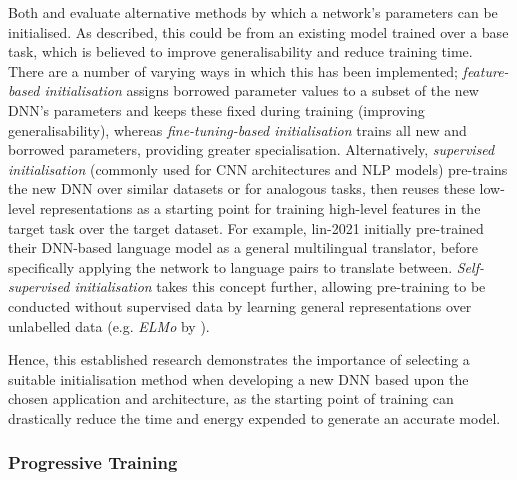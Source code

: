 \documentclass[a4paper, 11pt]{report}
\begin{document}
    Both \citet{hanin-2018} and \citet{xu-2021} evaluate alternative methods by which a network's parameters can be initialised. As described, this could be from an existing model trained over a base task, which is believed to improve generalisability and reduce training time. There are a number of varying ways in which this has been implemented; \emph{feature-based initialisation} assigns borrowed parameter values to a subset of the new DNN's parameters and keeps these fixed during training (improving generalisability), whereas \emph{fine-tuning-based initialisation} trains all new and borrowed parameters, providing greater specialisation. Alternatively, \emph{supervised initialisation} (commonly used for CNN architectures and NLP models) pre-trains the new DNN over similar datasets or for analogous tasks, then reuses these low-level representations as a starting point for training high-level features in the target task over the target dataset. For example, lin-2021 initially pre-trained their DNN-based language model as a general multilingual translator, before specifically applying the network to language pairs to translate between. \emph{Self-supervised initialisation} takes this concept further, allowing pre-training to be conducted without supervised data by learning general representations over unlabelled data (e.g. \emph{ELMo} by \citet{peters-2018}).

    Hence, this established research demonstrates the importance of selecting a suitable initialisation method when developing a new DNN based upon the chosen application and architecture, as the starting point of training can drastically reduce the time and energy expended to generate an accurate model.


    \subsubsection{Progressive Training}
    \label{section: progressive-training}
\end{document}
